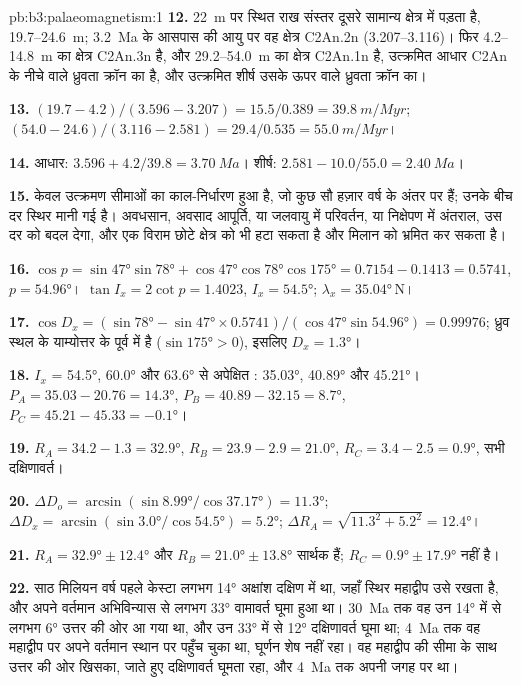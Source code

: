 \begin{solution}{pb:b3:palaeomagnetism:1}
\textbf{12.} \qty{22}{m} पर स्थित राख संस्तर दूसरे सामान्य क्षेत्र में पड़ता है,
19.7--\qty{24.6}{m}; \qty{3.2}{Ma} के आसपास की आयु पर वह क्षेत्र C2An.2n
(3.207--3.116)। फिर 4.2--\qty{14.8}{m} का क्षेत्र C2An.3n है, और
29.2--\qty{54.0}{m} का क्षेत्र C2An.1n है, उत्क्रमित आधार C2An के नीचे वाले ध्रुवता क्रॉन का है,
और उत्क्रमित शीर्ष उसके ऊपर वाले ध्रुवता क्रॉन का।

\textbf{13.} $(19.7 - 4.2)/(3.596 - 3.207) = 15.5/0.389 = \qty{39.8}{m/Myr}$;
$(54.0 - 24.6)/(3.116 - 2.581) = 29.4/0.535 = \qty{55.0}{m/Myr}$।

\textbf{14.} आधार: $3.596 + 4.2/39.8 = \qty{3.70}{Ma}$। शीर्ष: $2.581 -
10.0/55.0 = \qty{2.40}{Ma}$।

\textbf{15.} केवल उत्क्रमण सीमाओं का काल-निर्धारण हुआ है, जो कुछ सौ हज़ार वर्ष के अंतर पर हैं;
उनके बीच दर स्थिर मानी गई है। अवधसान, अवसाद आपूर्ति, या जलवायु में
परिवर्तन, या निक्षेपण में अंतराल, उस दर को बदल देगा, और
एक विराम छोटे क्षेत्र को भी हटा सकता है और मिलान को भ्रमित कर सकता है।

\textbf{16.} $\cos p = \sin\ang{47}\sin\ang{78} + \cos\ang{47}\cos\ang{78}
\cos\ang{175} = 0.7154 - 0.1413 = 0.5741$, $p = \ang{54.96}$। $\tan I_x =
2\cot p = 1.4023$, $I_x = \ang{54.5}$; $\lambda_x = \ang{35.04}$\,N।

\textbf{17.} $\cos D_x = (\sin\ang{78} - \sin\ang{47}\times0.5741)/
(\cos\ang{47}\sin\ang{54.96}) = 0.99976$; ध्रुव स्थल के
याम्योत्तर के पूर्व में है ($\sin\ang{175} > 0$), इसलिए $D_x = \ang{1.3}$।

\textbf{18.} $I_x$ = \ang{54.5}, \ang{60.0} और
\ang{63.6} से अपेक्षित : \ang{35.03}, \ang{40.89} और \ang{45.21}। $P_A = 35.03 - 20.76 =
\ang{14.3}$, $P_B = 40.89 - 32.15 = \ang{8.7}$, $P_C = 45.21 - 45.33 =
\ang{-0.1}$।

\textbf{19.} $R_A = 34.2 - 1.3 = \ang{32.9}$, $R_B = 23.9 - 2.9 = \ang{21.0}$,
$R_C = 3.4 - 2.5 = \ang{0.9}$, सभी दक्षिणावर्त।

\textbf{20.} $\Delta D_o = \arcsin(\sin\ang{8.99}/\cos\ang{37.17}) = \ang{11.3}$;
$\Delta D_x = \arcsin(\sin\ang{3.0}/\cos\ang{54.5}) = \ang{5.2}$; $\Delta R_A =
\sqrt{11.3^2 + 5.2^2} = \ang{12.4}$।

\textbf{21.} $R_A = \ang{32.9} \pm \ang{12.4}$ और $R_B = \ang{21.0} \pm
\ang{13.8}$ सार्थक हैं; $R_C = \ang{0.9} \pm \ang{17.9}$ नहीं है।

\textbf{22.} साठ मिलियन वर्ष पहले केस्टा लगभग \ang{14} अक्षांश
दक्षिण में था, जहाँ स्थिर महाद्वीप उसे रखता है, और अपने वर्तमान अभिविन्यास से लगभग \ang{33}
वामावर्त घूमा हुआ था। \qty{30}{Ma} तक वह उन \ang{14} में से लगभग
\ang{6} उत्तर की ओर आ गया था, और उन \ang{33} में से \ang{12} दक्षिणावर्त घूमा
था; \qty{4}{Ma} तक वह महाद्वीप पर अपने वर्तमान स्थान पर पहुँच चुका था,
घूर्णन शेष नहीं रहा। वह महाद्वीप की सीमा के साथ उत्तर की ओर खिसका,
जाते हुए दक्षिणावर्त घूमता रहा, और \qty{4}{Ma} तक अपनी जगह पर था।


\end{solution}

